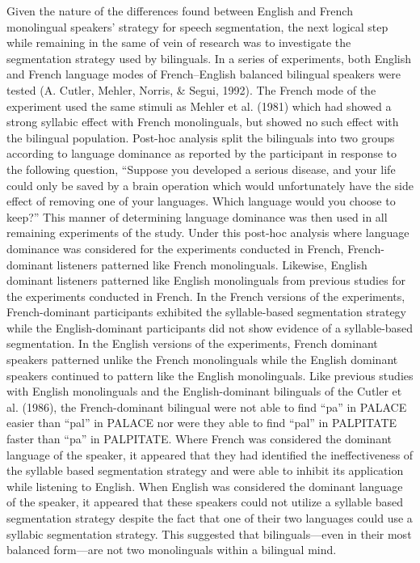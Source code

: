 Given the nature of the differences found between English and French monolingual speakers’ strategy for speech segmentation, the next logical step while remaining in the same of vein of research was to investigate the segmentation strategy used by bilinguals. In a series of experiments, both English and French language modes of French–English balanced bilingual speakers were tested (A. Cutler, Mehler, Norris, \& Segui, 1992). The French mode of the experiment used the same stimuli as Mehler et al. (1981) which had showed a strong syllabic effect with French monolinguals, but showed no such effect with the bilingual population. Post-hoc analysis split the bilinguals into two groups according to language dominance as reported by the participant in response to the following question, “Suppose you developed a serious disease, and your life could only be saved by a brain operation which would unfortunately have the side effect of removing one of your languages. Which language would you choose to keep?” This manner of determining language dominance was then used in all remaining experiments of the study. Under this post-hoc analysis where language dominance was considered for the experiments conducted in French, French-dominant listeners patterned like French monolinguals. Likewise, English dominant listeners patterned like English monolinguals from previous studies for the experiments conducted in French. In the French versions of the experiments, French-dominant participants exhibited the syllable-based segmentation strategy while the English-dominant participants did not show evidence of a syllable-based segmentation.  In the English versions of the experiments, French dominant speakers patterned unlike the French monolinguals while the English dominant speakers continued to pattern like the English monolinguals. Like previous studies with English monolinguals and the English-dominant bilinguals of the Cutler et al. (1986), the French-dominant bilingual were not able to find “pa” in PALACE easier than “pal” in PALACE nor were they able to find “pal” in PALPITATE faster than “pa” in PALPITATE. Where French was considered the dominant language of the speaker, it appeared that they had identified the ineffectiveness of the syllable based segmentation strategy and were able to inhibit its application while listening to English. When English was considered the dominant language of the speaker, it appeared that these speakers could not utilize a syllable based segmentation strategy despite the fact that one of their two languages could use a syllabic segmentation strategy.  This suggested that bilinguals—even in their most balanced form—are not two monolinguals within a bilingual mind.
